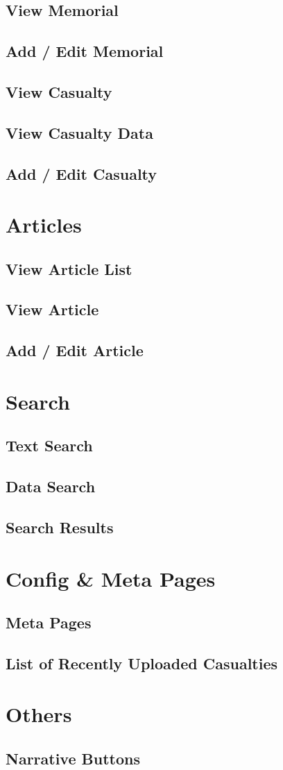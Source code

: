 \documentclass[12pt]{article}
\begin{document}
\subsection{View Memorial}
\subsection{Add / Edit Memorial}
\subsection{View Casualty}
\subsection{View Casualty Data}
\subsection{Add / Edit Casualty}


\section{Articles}\label{sec:articles}
\subsection{View Article List}
\subsection{View Article}
\subsection{Add / Edit Article}

\section{Search}\label{sec:search}
\subsection{Text Search}
\subsection{Data Search}
\subsection{Search Results}

\section{Config \& Meta Pages}\label{sec:config}
\subsection{Meta Pages}
\subsection{List of Recently Uploaded Casualties}

\section{Others}
\subsection{Narrative Buttons}
\end{document}
